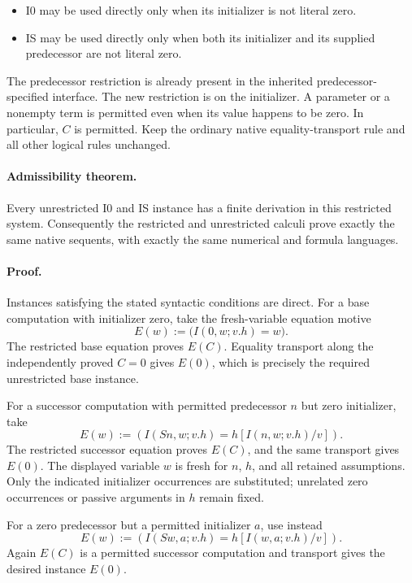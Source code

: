 \documentclass[11pt,letterpaper]{article}
\theoremstyle{definition}\newtheorem{definition}[theorem]{Definition}
\theoremstyle{remark}\newtheorem{remark}[theorem]{Remark}
\begin{document}
\begin{itemize}
\item I0 may be used directly only when its initializer is not literal
  zero.
\item IS may be used directly only when both its initializer and its
  supplied predecessor are not literal zero.
\end{itemize}

The predecessor restriction is already present in the inherited
predecessor-specified interface.  The new restriction is on the
initializer.  A parameter or a nonempty term is permitted even when its
value happens to be zero.  In particular, $C$ is permitted.  Keep the
ordinary native equality-transport rule and all other logical rules
unchanged.

\paragraph{Admissibility theorem.}
Every unrestricted I0 and IS instance has a finite derivation in this
restricted system.  Consequently the restricted and unrestricted
calculi prove exactly the same native sequents, with exactly the same
numerical and formula languages.

\paragraph{Proof.}
Instances satisfying the stated syntactic conditions are direct.
For a base computation with initializer zero, take the fresh-variable
equation motive
\[
                  E(w):=\bigl(I(0,w;v.h)=w\bigr).
\]
The restricted base equation proves $E(C)$.  Equality transport along
the independently proved $C=0$ gives $E(0)$, which is precisely the
required unrestricted base instance.

For a successor computation with permitted predecessor $n$ but zero
initializer, take
\[
 E(w):=\left(I(Sn,w;v.h)=h[I(n,w;v.h)/v]\right).
\]
The restricted successor equation proves $E(C)$, and the same transport
gives $E(0)$.  The displayed variable $w$ is fresh for $n$, $h$, and all
retained assumptions.  Only the indicated initializer occurrences are
substituted; unrelated zero occurrences or passive arguments in $h$
remain fixed.

For a zero predecessor but a permitted initializer $a$, use instead
\[
 E(w):=\left(I(Sw,a;v.h)=h[I(w,a;v.h)/v]\right).
\]
Again $E(C)$ is a permitted successor computation and transport gives
the desired instance $E(0)$.
\end{document}
